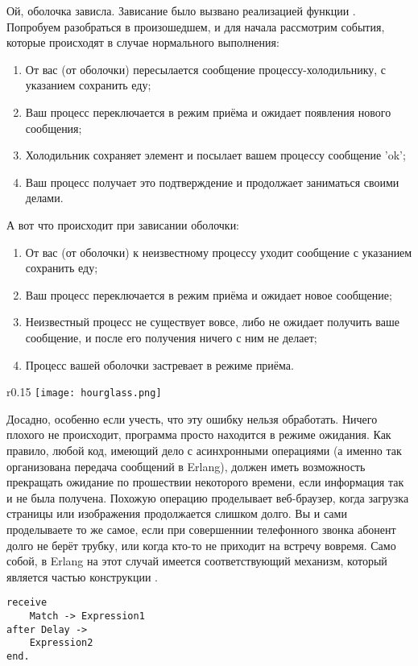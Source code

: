 Ой, оболочка зависла.
Зависание было вызвано реализацией функции .
Попробуем разобраться в произошедшем, и для начала рассмотрим события, которые происходят в случае нормального выполнения:
\begin{enumerate}
    \item От вас (от оболочки) пересылается сообщение процессу\--холодильнику, с указанием сохранить еду;
    \item Ваш процесс переключается в режим приёма и ожидает появления нового сообщения;
    \item Холодильник сохраняет элемент и посылает вашем процессу сообщение 'ok';
    \item Ваш процесс получает это подтверждение и продолжает заниматься своими делами.
\end{enumerate}
А вот что происходит при зависании оболочки:
\begin{enumerate}
    \item От вас (от оболочки) к неизвестному процессу уходит сообщение с указанием сохранить еду;
    \item Ваш процесс переключается в режим приёма и ожидает новое сообщение;
    \item Неизвестный процесс не существует вовсе, либо не ожидает получить ваше сообщение, и после его получения ничего с ним не делает;
    \item Процесс вашей оболочки застревает в режиме приёма.
\end{enumerate}
\begin{wrapfigure}{r}{0.15\linewidth}
    \texttt{[image: hourglass.png]}
\end{wrapfigure}

Досадно, особенно если учесть, что эту ошибку нельзя обработать.
Ничего плохого не происходит, программа просто находится в режиме ожидания.
Как правило, любой код, имеющий дело с асинхронными операциями (а именно так организована передача сообщений в Erlang), должен иметь возможность прекращать ожидание по прошествии некоторого времени, если информация так и не была получена.
Похожую операцию проделывает веб\--браузер, когда загрузка страницы или изображения продолжается слишком долго.
Вы и сами проделываете то же самое, если при совершеннии телефонного звонка абонент долго не берёт трубку, или когда кто\--то не приходит на встречу вовремя.
Само собой, в Erlang на этот случай имеется соответствующий механизм, который является частью конструкции .
\begin{lstlisting}[style=erlang]
receive
    Match -> Expression1
after Delay ->
    Expression2
end.
\end{lstlisting}

